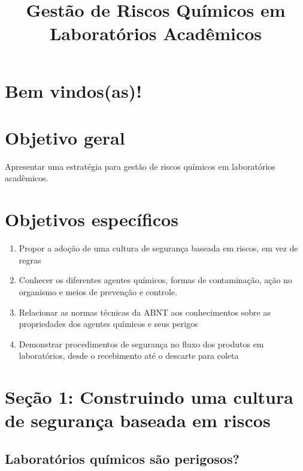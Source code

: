 \documentclass[
  letterpaper,
  DIV=11,
  numbers=noendperiod]{scrartcl}
\title{\textbf{Gestão de Riscos Químicos em Laboratórios Acadêmicos}}
\author{}
\date{}
\providecommand{\tightlist}{%
  \setlength{\itemsep}{0pt}\setlength{\parskip}{0pt}}\usepackage{longtable,booktabs,array}
\begin{document}
\maketitle


\section{Bem vindos(as)!}\label{bem-vindosas}

\section{Objetivo geral}\label{objetivo-geral}

Apresentar uma estratégia para gestão de riscos químicos em laboratórios
acadêmicos.

\section{Objetivos específicos}\label{objetivos-especuxedficos}

\begin{enumerate}
\def\labelenumi{\arabic{enumi}.}
\tightlist
\item
  Propor a adoção de uma cultura de segurança baseada em riscos, em vez
  de regras
\item
  Conhecer os diferentes agentes químicos, formas de contaminação, ação
  no organismo e meios de prevenção e controle.
\item
  Relacionar as normas técnicas da ABNT aos conhecimentos sobre as
  propriedades dos agentes químicos e seus perigos
\item
  Demonstrar procedimentos de segurança no fluxo dos produtos em
  laboratórios, desde o recebimento até o descarte para coleta
\end{enumerate}

\section{Seção 1: Construindo uma cultura de segurança baseada em
riscos}\label{seuxe7uxe3o-1-construindo-uma-cultura-de-seguranuxe7a-baseada-em-riscos}

\subsection{Laboratórios químicos são
perigosos?}\label{laboratuxf3rios-quuxedmicos-suxe3o-perigosos}
\end{document}
